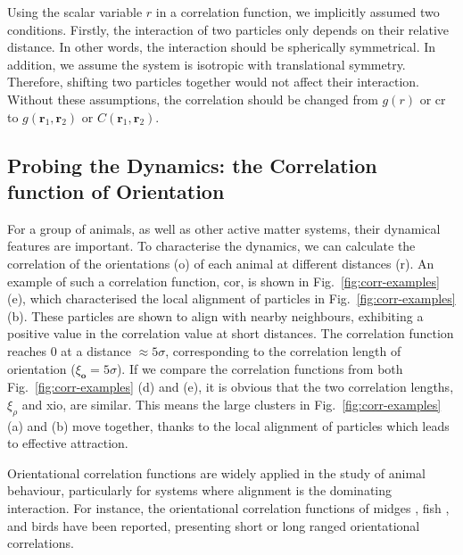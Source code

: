\documentclass[11pt,twoside]{report}
\begin{document}
\begin{tcolorbox}[
title=Implicit Assumption of the Pairwise Distance $r$,
enlarge bottom by=0.5em,
enlarge top by=0.5em,
]
Using the scalar variable $r$ in a correlation function, we implicitly assumed two conditions. Firstly, the interaction of two particles only depends on their relative distance. In other words, the interaction should be spherically symmetrical. In addition, we assume the system is isotropic with translational symmetry. Therefore, shifting two particles together would not affect their interaction. Without these assumptions, the correlation should be changed from $g(r)$ or \gls{cr} to $g(\mathbf{r}_1, \mathbf{r}_2)$ or $C(\mathbf{r}_1, \mathbf{r}_2)$.
\end{tcolorbox}



\subsection{Probing the Dynamics: the Correlation function of Orientation}
\label{section:intro-corr-cvv}

For a group of animals, as well as other active matter systems, their dynamical features are important. To characterise the dynamics, we can calculate the correlation of the orientations (\gls{o}) of each animal at different distances (\gls{r}). An example of such a correlation function, \gls{cor}, is shown in Fig.~\ref{fig:corr-examples} (e), which characterised the local alignment of particles in Fig.~\ref{fig:corr-examples} (b). These particles are shown to align with nearby neighbours, exhibiting a positive value in the correlation value at short distances. 
The correlation function reaches 0 at a distance $\approx 5 \sigma$, corresponding to the correlation length of orientation ($\xi_\mathbf{o} = 5\sigma$).
If we compare the correlation functions from both Fig.~\ref{fig:corr-examples} (d) and (e), it is obvious that the two correlation lengths, $\xi_\rho$ and \gls{xio}, are similar. This means the large clusters in Fig.~\ref{fig:corr-examples} (a) and (b) move together, thanks to the local alignment of particles which leads to effective attraction.

Orientational correlation functions are widely applied in the study of animal behaviour, particularly for systems where alignment is the dominating interaction. For instance, the orientational correlation functions of midges \cite{attanasi2014pcb, ni2015epj}, fish \cite{yang2021pcb}, and birds \cite{cavagna2010} have been  reported, presenting short or long ranged orientational correlations.
\end{document}

